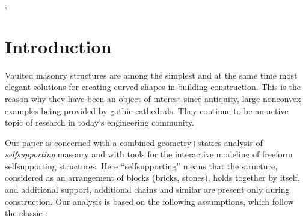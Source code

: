 \documentclass[review]{acmsiggraph}
\newcommand{\todo}[1]{\textcolor{red}{#1}}
\begin{document}

\begin{CRcatlist}
  ;
\end{CRcatlist}


\keywordlist


\TOGlinkslist


\copyrightspace


\insert\footins{\vspace*{4cm}}

\section{Introduction}



Vaulted masonry structures are among the simplest and at the same time 
most elegant solutions for creating curved shapes in building 
construction. This is the reason why they have been an object of interest 
since antiquity, large non\dash convex examples being provided by gothic 
cathedrals. They continue to be an active topic of research in today's 
engineering community.


Our paper is concerned with a combined geometry+statics analysis of {\em 
self\dash supporting} masonry and with tools for the interactive modeling 
of freeform self\dash supporting structures. Here ``self\dash supporting'' 
means that the structure, considered as an arrangement of blocks (bricks, 
stones), holds together by itself, and additional support, additional 
chains and similar are present only during construction. Our analysis is 
based on the following assumptions, which follow the classic 
\cite{Heyman66}:
\end{document}
